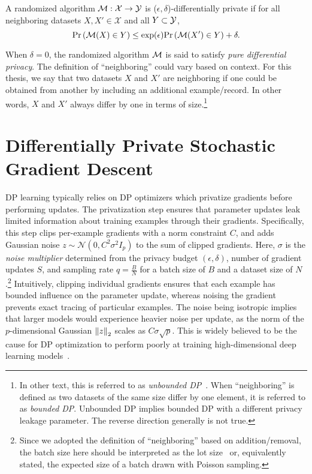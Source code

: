 \begin{defi}[Approximate-DP]
A randomized algorithm $\mathcal{M}: \mathcal{X} \to \mathcal{Y}$ is ($\epsilon, \delta$)-differentially private if for all neighboring datasets $X, X'\in\mathcal{X}$ and all $Y \subset \mathcal{Y}$, 
$$
\mathrm{Pr}\left(\mathcal{M}(X) \in Y\right) \le \exp( \epsilon ) \mathrm{Pr}\left( \mathcal{M}(X') \in Y \right) + \delta.
\label{eq:epsilon_delta_dp}
$$
\end{defi}
When $\delta=0$, the randomized algorithm $\mathcal{M}$ is said to satisfy \emph{pure differential privacy}.
The definition of ``neighboring'' could vary based on context. 
For this thesis, we say that two datasets $X$ and $X'$ are neighboring if one could be obtained from
another by including an additional example/record. 
In other words, $X$ and $X'$ always differ by one in terms of size.\footnote{
In other text, this is referred to as \emph{unbounded DP}~\cite{kifer2011no}. When ``neighboring'' is defined as two datasets of the same size differ by one element, it is referred to as \emph{bounded DP}.
Unbounded DP implies bounded DP with a different privacy leakage parameter.
The reverse direction generally is not true.
}



\section[Differentially Private Stochastic Gradient Descent]{\large Differentially Private Stochastic Gradient Descent}

DP learning typically relies on DP optimizers which privatize gradients before performing updates. 
The privatization step ensures that parameter updates leak limited information about training examples through their gradients.
Specifically, this step clips per-example gradients with a norm constraint $C$, and adds Gaussian noise $z\sim\mathcal{N}(0, C^2\sigma^2 I_p)$ to the sum of clipped gradients.
Here, $\sigma$ is the \textit{noise multiplier} determined from the privacy budget $(\epsilon, \delta)$, number of gradient updates $S$, and sampling rate $q=\tfrac{B}{N}$ for a batch size of $B$ and a dataset size of $N$.\footnote{Since we adopted the definition of ``neighboring'' based on addition/removal, the batch size here should be interpreted as the lot size~\citep{abadi2016deep} or, equivalently stated, the expected size of a batch drawn with Poisson sampling.}
Intuitively, clipping individual gradients ensures that each example has bounded influence on the parameter update, whereas noising the gradient prevents exact tracing of particular examples.
The noise being isotropic implies that larger models would experience heavier noise per update, as the norm of the $p$-dimensional Gaussian $\left\lVert z\right\rVert_2$ scales as $C \sigma \sqrt{p}$.
This is widely believed to be the cause for DP optimization to perform poorly at training high-dimensional deep learning models~\citep{gautum14,yu2021not}.

